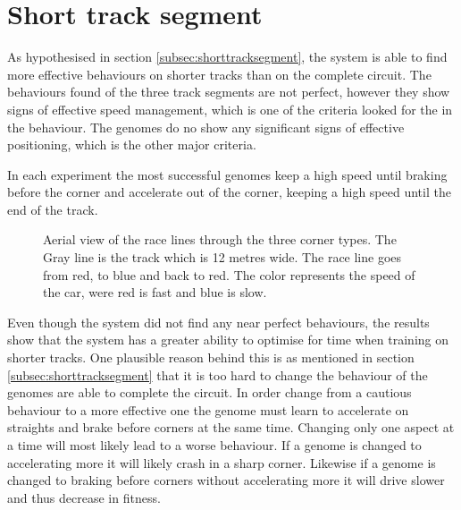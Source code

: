 \section{Short track segment}

As hypothesised in section \ref{subsec:shorttracksegment}, the system is able to find more effective behaviours on shorter tracks than on the complete circuit. The behaviours found of the three track segments are not perfect, however they show signs of effective speed management, which is one of the criteria looked for the in the behaviour. The genomes do no show any significant signs of effective positioning, which is the other major criteria. 

In each experiment the most successful genomes keep a high speed until braking before the corner and accelerate out of the corner, keeping a high speed until the end of the track. 

\begin{figure}[H]
    \centering
    \qquad
    \qquad

    \caption{Aerial view of the race lines through the three corner types. The Gray line is the track which is 12 metres wide. The race line goes from red, to blue and back to red. The color represents the speed of the car, were red is fast and blue is slow.}
\end{figure}

Even though the system did not find any near perfect behaviours, the results show that the system has a greater ability to optimise for time when training on shorter tracks. One plausible reason behind this is as mentioned in section \ref{subsec:shorttracksegment} that it is too hard to change the behaviour of the genomes are able to complete the circuit. In order change from a cautious behaviour to a more effective one the genome must learn to accelerate on straights and brake before corners at the same time. Changing only one aspect at a time will most likely lead to a worse behaviour. If a genome is changed to accelerating more it will likely crash in a sharp corner. Likewise if a genome is changed to braking before corners without accelerating more it will drive slower and thus decrease in fitness.  


